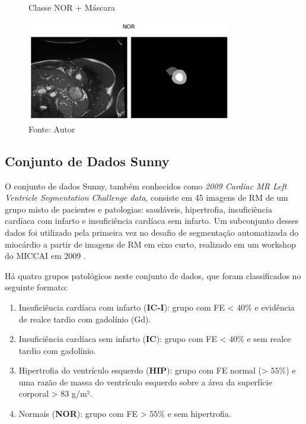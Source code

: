 \begin{figure}[H]
    \centering
    \caption{Classe NOR + Máscara}
    \includegraphics[width=0.8\textwidth]{figures/fig033-03.png}
    \caption*{Fonte: Autor}
    \label{fig:fig033-03}
\end{figure}

\subsection{Conjunto de Dados Sunny} 
\label{subsec:cap4_sunny}

O conjunto de dados Sunny, também conhecidos como \textit{2009 Cardiac MR Left Ventricle Segmentation Challenge data}, consiste em 45 imagens de RM de um grupo misto de pacientes e patologias: saudáveis, hipertrofia, insuficiência cardíaca com infarto e insuficiência cardíaca sem infarto. Um subconjunto desses dados foi utilizado pela primeira vez no desafio de segmentação automatizada do miocárdio a partir de imagens de RM em eixo curto, realizado em um workshop do MICCAI em 2009 \cite{radauEvaluationFrameworkAlgorithms2009}. 

Há quatro grupos patológicos neste conjunto de dados, que foram classificados no seguinte formato:

\begin{enumerate}
    \item Insuficiência cardíaca com infarto (\textbf{IC-I}): grupo com \gls{FE} < $40$\% e evidência de realce tardio com gadolínio (Gd).
    \item Insuficiência cardíaca sem infarto (\textbf{IC}): grupo com \gls{FE} < $40$\% e sem realce tardio com gadolínio.
    \item Hipertrofia do ventrículo esquerdo (\textbf{HIP}): grupo com \gls{FE} normal (> $55$\%) e uma razão de massa do ventrículo esquerdo sobre a área da superfície corporal > $83$ g/m².
    \item Normais (\textbf{NOR}): grupo com \gls{FE} > $55$\% e sem hipertrofia.
\end{enumerate}

